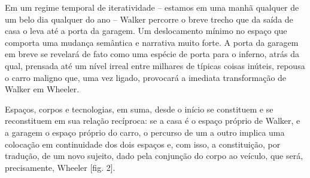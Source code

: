 \begin{multicols}{2}
{{}
}
\par
\par{}Em um regime temporal de iteratividade – estamos em uma manhã qualquer de um belo dia qualquer do ano – Walker percorre o breve trecho que da saída de casa o leva até a porta da garagem.\allowbreak{} Um deslocamento mínimo no espaço que comporta uma mudança semântica e narrativa muito forte.\allowbreak{} A porta da garagem em breve se revelará de fato como uma espécie de porta para o inferno,\allowbreak{} atrás da qual,\allowbreak{} prensada até um nível irreal entre milhares de típicas coisas inúteis,\allowbreak{} repousa o carro maligno que,\allowbreak{} uma vez ligado,\allowbreak{} provocará a imediata transformação de Walker em Wheeler.\allowbreak{}\par{}Espaços,\allowbreak{} corpos e tecnologias,\allowbreak{} em suma,\allowbreak{} desde o início se constituem e se reconstituem em sua relação recíproca:\allowbreak{} se a casa é o espaço próprio de Walker,\allowbreak{} e a garagem o espaço próprio do carro,\allowbreak{} o percurso de um a outro implica uma colocação em continuidade dos dois espaços e,\allowbreak{} com isso,\allowbreak{} a constituição,\allowbreak{} por tradução,\allowbreak{} de um novo sujeito,\allowbreak{} dado pela conjunção do corpo ao veículo,\allowbreak{} que será,\allowbreak{} precisamente,\allowbreak{} Wheeler [fig.\allowbreak{} 2].\allowbreak{}
\par
{
}
\par


\end{multicols}
